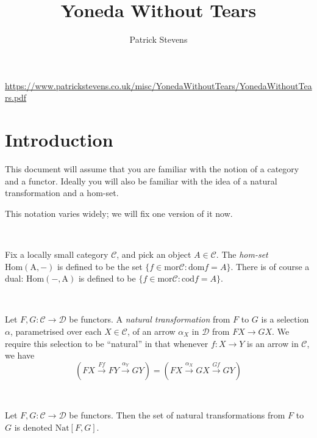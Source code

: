 \documentclass[11pt]{amsart}
\title{Yoneda Without Tears}
\author{Patrick Stevens}
\newcommand{\homfrom}[1]{\mathrm{Hom\left(#1, -\right)}}
\newcommand{\homto}[1]{\mathrm{Hom\left(-,#1\right)}}
\newcommand{\Nat}{\mathrm{Nat}}
\begin{document}
    \maketitle

    \tiny \begin{center} \url{https://www.patrickstevens.co.uk/misc/YonedaWithoutTears/YonedaWithoutTears.pdf} \end{center}

    \normalsize

    \section{Introduction}
    This document will assume that you are familiar with the notion of a category and a functor.
    Ideally you will also be familiar with the idea of a natural transformation and a hom-set.

    This notation varies widely; we will fix one version of it now.

    \

    \begin{definition}
        Fix a locally small category $\mathcal{C}$, and pick an object $A \in \mathcal{C}$.
        The \emph{hom-set} $\homfrom{A}$ is defined to be the set $\{f \in \mathrm{mor} \mathcal{C} : \mathrm{dom} f = A\}$.
        There is of course a dual: $\homto{A}$ is defined to be $\{f \in \mathrm{mor} \mathcal{C} : \mathrm{cod} f = A\}$.
    \end{definition}

    \

    \label{defn:nattrans}
    \begin{definition}
        Let $F, G: \mathcal{C} \to \mathcal{D}$ be functors.
        A \emph{natural transformation} from $F$ to $G$ is a selection $\alpha$, parametrised over each $X \in \mathcal{C}$, of an arrow $\alpha_X$ in $\mathcal{D}$ from $FX \to GX$.
        We require this selection to be ``natural'' in that whenever $f : X \to Y$ is an arrow in $\mathcal{C}$, we have $$(FX \xrightarrow{Ff} FY \xrightarrow{\alpha_Y} GY) = (FX \xrightarrow{\alpha_X} GX \xrightarrow{Gf} GY)$$
    \end{definition}

    \

    \begin{definition}
        Let $F, G : \mathcal{C} \to \mathcal{D}$ be functors.
        Then the set of natural transformations from $F$ to $G$ is denoted $\Nat[F, G]$.
    \end{definition}
\end{document}
